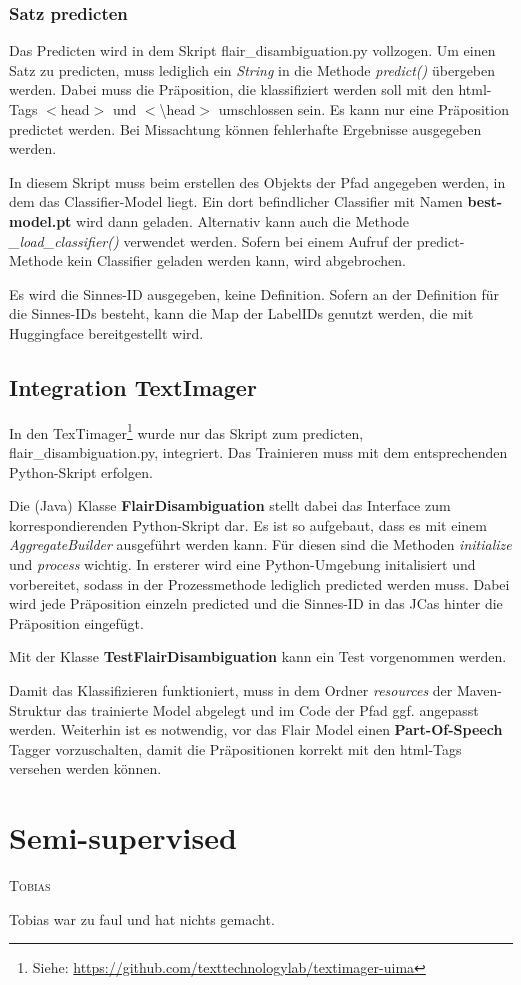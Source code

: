 \documentclass[10pt,a4paper]{article}
\newcommand{\chapterauthor}[1]{%
	{\parindent0pt\vspace*{-5pt}\hspace*{\fill}%
  \linespread{1.1}\large\scshape#1%
  \par\nobreak\vspace*{10pt}}
}
\begin{document}
\subsubsection{Satz predicten}
\begin{flushleft}
Das Predicten wird in dem Skript flair\_disambiguation.py vollzogen. Um einen Satz zu predicten, muss lediglich ein \textit{String} in die Methode \textit{predict()} übergeben werden. Dabei muss die Präposition, die klassifiziert werden soll mit den html-Tags $<$head$>$ und $<$\textbackslash head$>$ umschlossen sein. Es kann nur eine Präposition predictet werden. Bei Missachtung können fehlerhafte Ergebnisse ausgegeben werden.

In diesem Skript muss beim erstellen des Objekts der Pfad angegeben werden, in dem das Classifier-Model liegt. Ein dort befindlicher Classifier mit Namen \textbf{best-model.pt} wird dann geladen. Alternativ kann auch die Methode \textit{\_load\_classifier()} verwendet werden. Sofern bei einem Aufruf der predict-Methode kein Classifier geladen werden kann, wird abgebrochen.

Es wird die Sinnes-ID ausgegeben, keine Definition. Sofern an der Definition für die Sinnes-IDs besteht, kann die Map der LabelIDs genutzt werden, die mit Huggingface bereitgestellt wird.
\end{flushleft}

\subsection{Integration TextImager}
\begin{flushleft}
In den TexTimager\footnote{Siehe: \url{https://github.com/texttechnologylab/textimager-uima}} wurde nur das Skript zum predicten, flair\_disambiguation.py, integriert. Das Trainieren muss mit dem entsprechenden Python-Skript erfolgen.

Die (Java) Klasse \textbf{FlairDisambiguation} stellt dabei das Interface zum korrespondierenden Python-Skript dar. Es ist so aufgebaut, dass es mit einem \textit{AggregateBuilder} ausgeführt werden kann. Für diesen sind die Methoden \textit{initialize} und \textit{process} wichtig. In ersterer wird eine Python-Umgebung initalisiert und vorbereitet, sodass in der Prozessmethode lediglich predicted werden muss. Dabei wird jede Präposition einzeln predicted und die Sinnes-ID in das JCas hinter die Präposition eingefügt.

Mit der Klasse \textbf{TestFlairDisambiguation} kann ein Test vorgenommen werden.

Damit das Klassifizieren funktioniert, muss in dem Ordner \textit{resources} der Maven-Struktur das trainierte Model abgelegt und im Code der Pfad ggf. angepasst werden. Weiterhin ist es notwendig, vor das Flair Model einen \textbf{Part-Of-Speech} Tagger vorzuschalten, damit die Präpositionen korrekt mit den html-Tags versehen werden können.
\end{flushleft}

\newpage

\section{Semi-supervised}
\chapterauthor{Tobias}
Tobias war zu faul und hat nichts gemacht.

\newpage

\begingroup
\raggedright
\sloppy
\printbibliography
\endgroup
\end{document}
